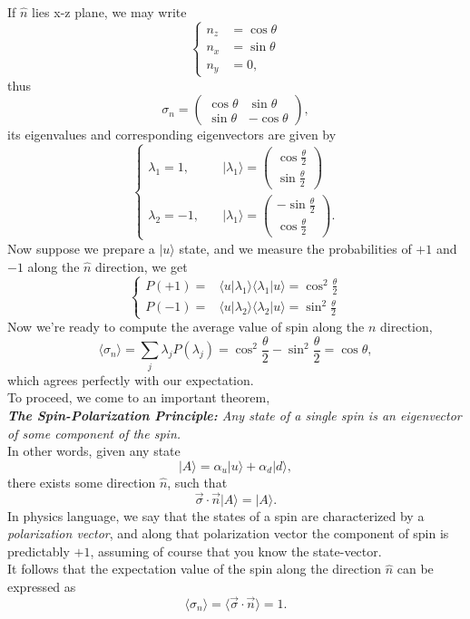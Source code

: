 \documentclass{article}
\newcommand{\be}{\begin{equation}}
\newcommand{\ee}{\end{equation}}
\newcommand{\ba}{\begin{array}}
\newcommand{\ea}{\end{array}}
\newcommand{\1}{\left}
\newcommand{\2}{\right}
\newcommand{\br}{\langle}
\newcommand{\ke}{\rangle}
\newcommand{\al}{\alpha}
\newcommand{\lam}{\lambda}
\newcommand{\sig}{\sigma}
\begin{document}
If $\hat n$ lies x-z plane, we may write
\be\1\{\begin{split}
n_z&=\cos\theta\\
n_x&=\sin\theta\\
n_y&=0,
\end{split}\2.\ee
thus 
\be
\sig_n=\1(\ba{cc}\cos\theta&\sin\theta\\\sin\theta&-\cos\theta\ea\2),
\ee
its eigenvalues and corresponding eigenvectors are given by
\be\1\{\begin{split}
\lam_1=1, &\quad|\lam_1\ke=\1(\ba{c}\cos{\frac\theta 2}\\\sin{\frac\theta 2}\ea\2)\\
\lam_2=-1, &\quad|\lam_1\ke=\1(\ba{c}-\sin{\frac\theta 2}\\\cos{\frac\theta 2}\ea\2).
\end{split}\2.\ee
Now suppose we prepare a $|u\ke$ state, and we measure the probabilities of $+1$ and $-1$ along the $\hat n$ direction, we get
\be\1\{\begin{split}
P(+1)=&\br u|\lam_1\ke\br\lam_1|u\ke=\cos^2{\frac{\theta}{2}}\\
P(-1)=&\br u|\lam_2\ke\br\lam_2|u\ke=\sin^2{\frac{\theta}{2}}
\end{split}\2.\ee
Now we're ready to compute the average value of spin along the $n$ direction,
\be
\br \sig_n\ke=\sum_j \lam_j P(\lam_j)=\cos^2{\frac{\theta}{2}}-\sin^2{\frac{\theta}{2}}=\cos{\theta},
\ee
which agrees perfectly with our expectation.\\

To proceed, we come to an important theorem,\\

\textit{\textbf{The Spin-Polarization Principle:} Any state of a single spin is an eigenvector of some component of the spin.}\\

In other words, given any state
\be
|A\ke=\al_u|u\ke+\al_d|d\ke,
\ee
there exists some direction $\hat n$, such that
\be
\vec\sig\cdot\vec n|A\ke= |A\ke.
\ee
In physics language, we say that the states of a spin are characterized by a \textit{polarization vector}, and along that polarization vector the component of spin is predictably $+1$, assuming of course that you know the state-vector.\\ It follows that the expectation value of the spin along the direction $\hat n$ can be expressed as
\be
\br\sig_n\ke=\br \vec\sig\cdot\vec n\ke=1.
\ee
\end{document}

